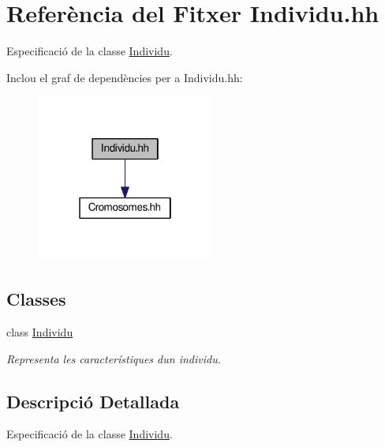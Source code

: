 \hypertarget{_individu_8hh}{}\section{Referència del Fitxer Individu.\+hh}
\label{_individu_8hh}


Especificació de la classe \hyperlink{class_individu}{Individu}.  


Inclou el graf de dependències per a Individu.\+hh\+:
\nopagebreak
\begin{figure}[H]
\begin{center}
\leavevmode
\includegraphics[width=166pt]{_individu_8hh__incl}
\end{center}
\end{figure}
\subsection*{Classes}
\begin{DoxyCompactItemize}
\item 
class \hyperlink{class_individu}{Individu}
\begin{DoxyCompactList}\small\item\em Representa les característiques d\textquotesingle{}un individu. \end{DoxyCompactList}\end{DoxyCompactItemize}


\subsection{Descripció Detallada}
Especificació de la classe \hyperlink{class_individu}{Individu}. 

